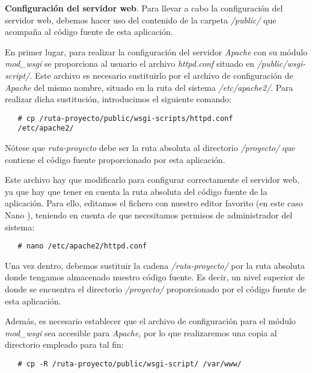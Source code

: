 \item \textbf{Configuración del servidor web}.
   Para llevar a cabo la configuración del servidor web, debemos hacer uso del
   contenido de la carpeta \textit{/public/} que acompaña al código fuente de
   esta aplicación.

   En primer lugar, para realizar la configuración del servidor \textit{Apache}
   con su módulo \textit{mod\_wsgi} se proporciona al usuario el archivo
   \textit{httpd.conf} situado en \textit{/public/wsgi-script/}. Este archivo
   es necesario sustituirlo por el archivo de configuración de \textit{Apache}
   del mismo nombre, situado en la ruta del sistema \textit{/etc/apache2/}. Para
   realizar dicha sustitución, introducimos el siguiente comando:

   \begin{verbatim}
   # cp /ruta-proyecto/public/wsgi-scripts/httpd.conf
   /etc/apache2/
   \end{verbatim}

   Nótese que \textit{ruta-proyecto} debe ser la ruta absoluta al directorio
   \textit{/proyecto/} que contiene el código fuente proporcionado por esta
   aplicación.

   Este archivo hay que modificarlo para configurar correctamente el servidor
   web, ya que hay que tener en cuenta la ruta absoluta del código fuente de
   la aplicación. Para ello, editamos el fichero con nuestro editor favorito
   (en este caso Nano \cite{nano}), teniendo en cuenta de que necesitamos
   permisos de administrador del sistema:

   \begin{verbatim}
   # nano /etc/apache2/httpd.conf
   \end{verbatim}

   Una vez dentro, debemos sustituir la cadena \textit{/ruta-proyecto/} por
   la ruta absoluta donde tengamos almacenado nuestro código fuente. Es decir,
   un nivel superior de donde se encuentra el directorio \textit{/proyecto/}
   proporcionado por el código fuente de esta aplicación.

   Además, es necesario establecer que el archivo de configuración para el
   módulo \textit{mod\_wsgi} sea accesible para \textit{Apache}, por lo que
   realizaremos una copia al directorio empleado para tal fin:

   \begin{verbatim}
   # cp -R /ruta-proyecto/public/wsgi-script/ /var/www/
   \end{verbatim}

